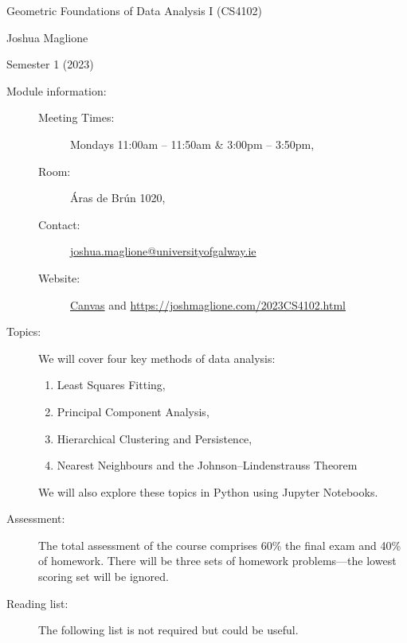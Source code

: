 \documentclass[a4paper, 12pt]{article}
\begin{document}
\pagestyle{empty}

\begin{center}
{\Large Geometric Foundations of Data Analysis I (CS4102)} 

\vspace{0.25cm}

{\large Joshua Maglione}

\vspace{0.25cm}

Semester 1 (2023)
\end{center}

\vspace{0.5cm}

\begin{description}
    \item[Module information:] \hfill
    \begin{description}
      \item[Meeting Times:] Mondays 11:00am -- 11:50am \& 3:00pm -- 3:50pm,
      \item[Room:] \'Aras de Br\'un 1020,
      \item[Contact:] \url{joshua.maglione@universityofgalway.ie} 
      \item[Website:] \href{https://universityofgalway.instructure.com/}{\textsf{Canvas}} and \url{https://joshmaglione.com/2023CS4102.html} 
    \end{description} 
    \vspace{1cm}
    \item[Topics:] We will cover four key methods of data analysis:
    \begin{enumerate} 
      \item Least Squares Fitting,
      \item Principal Component Analysis,
      \item Hierarchical Clustering and Persistence,
      \item Nearest Neighbours and the Johnson--Lindenstrauss Theorem
    \end{enumerate}
    We will also explore these topics in Python using Jupyter Notebooks.
    \vspace{1cm}
    \item[Assessment:] The total assessment of the course comprises 60\% the
    final exam and 40\% of homework. There will be three sets of homework problems---the lowest scoring set will be ignored. 
    \vspace{1cm}
    \item[Reading list:] The following list is not required but could be useful.

\end{description}
\end{document}
